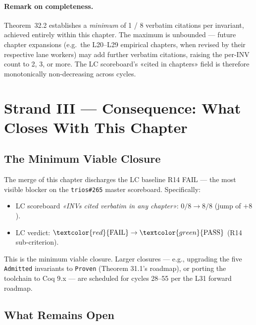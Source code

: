 \paragraph{Remark on completeness.} Theorem~32.2 establishes a \emph{minimum}
of 1 / 8 verbatim citations per invariant, achieved entirely within this
chapter. The maximum is unbounded — future chapter expansions (e.g.\ the L20–L29
empirical chapters, when revised by their respective lane workers) may add
further verbatim citations, raising the per-INV count to 2, 3, or more. The
LC scoreboard's «cited in chapters» field is therefore monotonically
non-decreasing across cycles.

\section{Strand III — Consequence: What Closes With This Chapter}
\label{sec:32-strand-3}

\subsection{The Minimum Viable Closure}
\label{sec:32-min-closure}

The merge of this chapter discharges the LC baseline R14 FAIL — the most
visible blocker on the \texttt{trios\#265} master scoreboard. Specifically:
\begin{itemize}
    \item LC scoreboard \emph{«INVs cited verbatim in any chapter»}:
          $0 / 8 \to 8 / 8$ (jump of $+8$).
    \item LC verdict: $\textcolor{red}{\text{FAIL}} \to
          \textcolor{green}{\text{PASS}}$ (R14 sub-criterion).
\end{itemize}

This is the minimum viable closure. Larger closures — e.g., upgrading the
five \texttt{Admitted} invariants to \texttt{Proven} (Theorem 31.1's roadmap),
or porting the toolchain to Coq 9.x — are scheduled for cycles 28–55 per
the L31 forward roadmap.

\subsection{What Remains Open}
\label{sec:32-remains-open}

